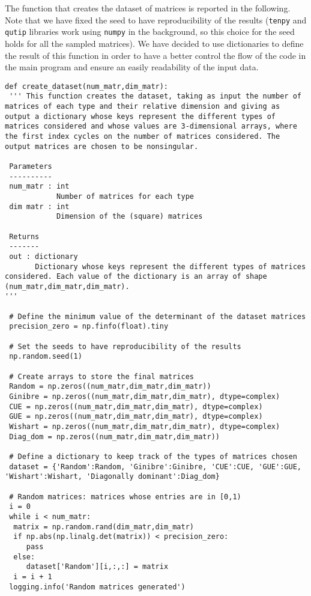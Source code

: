 \documentclass[a4paper,11pt]{report}
\begin{document}
\noindent The function that creates the dataset of matrices is reported in the following. Note that we have fixed the seed to have reproducibility of the results (\texttt{tenpy} and \texttt{qutip} libraries work using \texttt{numpy} in the background, so this choice for the seed holds for all the sampled matrices). We have decided to use dictionaries to define the result of this function in order to have a better control the flow of the code in the main program and ensure an easily readability of the input data.
\begin{verbatim}
def create_dataset(num_matr,dim_matr):
 ''' This function creates the dataset, taking as input the number of matrices of each type and their relative dimension and giving as output a dictionary whose keys represent the different types of matrices considered and whose values are 3-dimensional arrays, where the first index cycles on the number of matrices considered. The output matrices are chosen to be nonsingular.

 Parameters
 ----------
 num_matr : int
            Number of matrices for each type
 dim matr : int
            Dimension of the (square) matrices

 Returns
 -------
 out : dictionary
       Dictionary whose keys represent the different types of matrices considered. Each value of the dictionary is an array of shape (num_matr,dim_matr,dim_matr).
'''

 # Define the minimum value of the determinant of the dataset matrices
 precision_zero = np.finfo(float).tiny

 # Set the seeds to have reproducibility of the results
 np.random.seed(1)

 # Create arrays to store the final matrices
 Random = np.zeros((num_matr,dim_matr,dim_matr))
 Ginibre = np.zeros((num_matr,dim_matr,dim_matr), dtype=complex)
 CUE = np.zeros((num_matr,dim_matr,dim_matr), dtype=complex)
 GUE = np.zeros((num_matr,dim_matr,dim_matr), dtype=complex)
 Wishart = np.zeros((num_matr,dim_matr,dim_matr), dtype=complex)
 Diag_dom = np.zeros((num_matr,dim_matr,dim_matr))

 # Define a dictionary to keep track of the types of matrices chosen
 dataset = {'Random':Random, 'Ginibre':Ginibre, 'CUE':CUE, 'GUE':GUE, 'Wishart':Wishart, 'Diagonally dominant':Diag_dom}

 # Random matrices: matrices whose entries are in [0,1)
 i = 0
 while i < num_matr:  
  matrix = np.random.rand(dim_matr,dim_matr)
  if np.abs(np.linalg.det(matrix)) < precision_zero:
     pass
  else:
     dataset['Random'][i,:,:] = matrix
  i = i + 1
 logging.info('Random matrices generated')


\end{verbatim}
\end{document}
